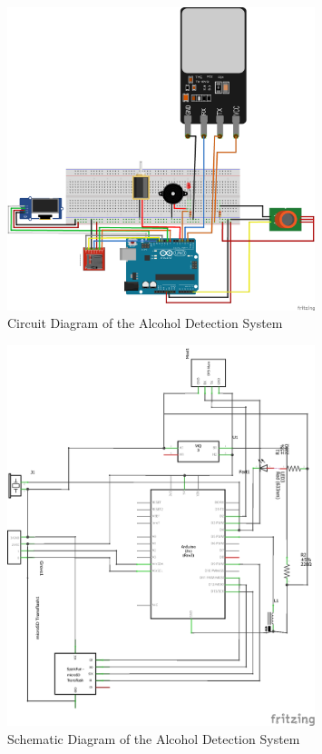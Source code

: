 \begin{figure}[H]
    \centering
    \includegraphics[width=0.8\textwidth]{images/circuit_diagram.png}
    \caption{Circuit Diagram of the Alcohol Detection System}
    \label{fig:circuit_diagram}
\end{figure}
\begin{figure}[H]
    \centering
    \includegraphics[width=0.8\textwidth]{images/schematic.png}
    \caption{Schematic Diagram of the Alcohol Detection System}
    \label{fig:schematic_diagram}
\end{figure}

